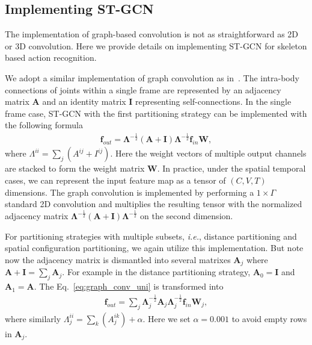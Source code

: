 \documentclass[letterpaper]{article} %
\begin{document}
\subsection{Implementing ST-GCN}
The implementation of graph-based convolution is not as straightforward as 2D or 3D convolution.
Here we provide details on implementing ST-GCN for skeleton based action recognition.

We adopt a similar implementation of graph convolution as in~\cite{Kipf2017ICLR}.
The intra-body connections of joints within a single frame are represented by an adjacency matrix $ \mathbf{A} $ and an identity matrix $ \mathbf{I} $ representing self-connections.
In the single frame case, ST-GCN with the first partitioning strategy can be implemented with the following formula~\cite{Kipf2017ICLR}
\begin{align}\label{eq:graph_conv_uni}
	\mathbf{f}_{out} = \mathbf{\Lambda}^{-\frac{1}{2}}(\mathbf{A} + \mathbf{I})\mathbf{\Lambda}^{-\frac{1}{2}}\mathbf{f}_{in}\mathbf{W},
\end{align}
where $ \Lambda^{ii} = \sum_j(A^{ij} + I^{ij}) $.
Here the weight vectors of multiple output channels are stacked to form the weight matrix $ \mathbf{W} $.
In practice, under the spatial temporal cases, we can represent the input feature map as a tensor of $(C, V, T)$ dimensions.
The graph convolution is implemented by performing a $ 1\times \Gamma $ standard 2D convolution and multiplies the resulting tensor with the normalized adjacency matrix $ \mathbf{\Lambda}^{-\frac{1}{2}}(\mathbf{A} + \mathbf{I})\mathbf{\Lambda}^{-\frac{1}{2}} $ on the second dimension.

For partitioning strategies with multiple subsets, \emph{i.e.}, distance partitioning and spatial configuration partitioning, we again utilize this implementation.
But note now the adjacency matrix is dismantled into several matrixes $ \mathbf{A}_j $ where $ \mathbf{A} + \mathbf{I} = \sum_j \mathbf{A}_j $.
For example in the distance partitioning strategy, $ \mathbf{A}_0 = \mathbf{I} $ and $ \mathbf{A}_1 = \mathbf{\mathbf{A}} $.
The Eq.~\ref{eq:graph_conv_uni} is transformed into
\begin{align}\label{eq:graph_conv_part}
	\mathbf{f}_{out} = \sum_j \mathbf{\Lambda}_j^{-\frac{1}{2}}\mathbf{A}_j\mathbf{\Lambda}_j^{-\frac{1}{2}}\mathbf{f}_{in}\mathbf{W}_j,
\end{align}
where similarly $ \Lambda^{ii}_j = \sum_k(A^{ik}_j) + \alpha$.
Here we set $ \alpha = 0.001 $ to avoid empty rows in $ \mathbf{A}_j $.
\end{document}
